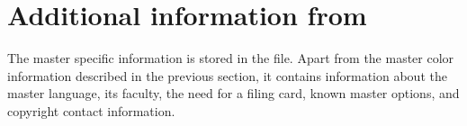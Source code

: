 \section{Additional information from }\label{sec:mastercfg}
The master specific information is stored in the  file.
Apart from the master color information described in the previous section,
it contains information about the master language, its faculty, the need
for a filing card, known master options, and copyright contact information.

\begingroup
\makeatletter
{}%
\let\kulemt@end@master@def\endinput
\def\ProvidesFile #1[#2]{%
  This section describes the \file{#1} file dated \printdateTeX{#2}.
  If no faculty name is shown, the master is an inter-faculty
  master.\par\raggedright}
\renewcommand*\kulemt@div@master[1]{\subsection{#1}}
\sideparswitchfalse \reversesidepartrue
\newcommand*\optionHangfrom{}
\newcommand*\handleOption[2]{%
  \ifvmode \@hangfrom{\optionHangfrom}\else \break \fi
  \textbf{--} \ \texttt{#1} (`#2')}
\newcommand*\printmasterinfo[2]{\par
  \addvspace\medskipamount \parindent\z@
  \kulemt@filingcardfalse \kulemt@set@master#2{}{}{}\@nil
  \leavevmode\sidepar{\raggedleft\texttt{#1}}\textsc{\kulemt@master@title}\par
  \nobreak \expandafter\MakeUppercase\kulemt@master@language\space master%
  \edef\@tempa{\kulemt@fac@name}\ifx\@tempa\@empty\else\space of the \@tempa\fi.
  A filing card is \ifkulemt@filingcard\else not \fi required.\par
  \nobreak \@hangfrom{Contact info: }\kulemt@contact@print\par
  \nobreak
  \ifx\kulemt@master@options@vl\relax
    The master doesn't allow you to mention a master option.%
  \else\ifx\kulemt@master@options@vl\@empty
    The master doesn't require you to mention a master option.%
  \else
    One of the following master options \emph{must} be used:
    \def\@tempb{}\@for\@tempa:=\kulemt@master@options@vl\do{%
      \@tempb\texttt{\@tempa}\def\@tempb{, }}.%
  \fi\fi \par
  \@tempswatrue \ifx\kulemt@master@options@v\@empty
    \ifx\kulemt@master@options@o\@empty \@tempswafalse \fi\fi
  \if@tempswa
    \nobreak Known master option abbreviations:\par%
    \ifx\kulemt@master@options@v\@empty\else
      \def\optionHangfrom{\quad}%
      \nobreak \kulemt@handle@mo\kulemt@master@options@v\handleOption \par
    \fi
    \ifx\kulemt@master@options@o\@empty\else
      \def\optionHangfrom{\quad obsolete: \ }%
      \nobreak \kulemt@handle@mo\kulemt@master@options@o\handleOption \par
    \fi
  \fi}
\let\kulemt@def@master\printmasterinfo
\newif\ifobsoletemaster
\renewcommand*\kulemt@obsolete@master[3][]{\obsoletemastertrue}

